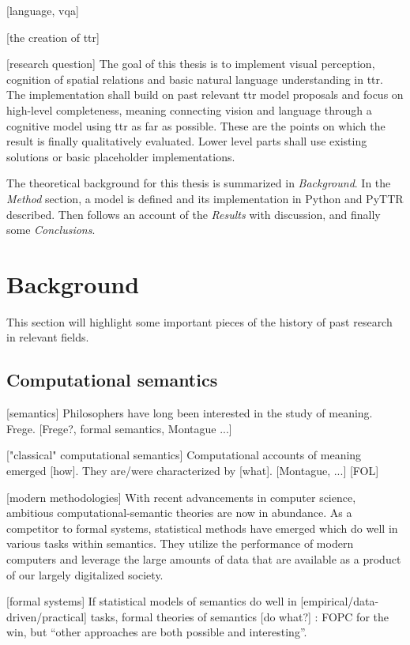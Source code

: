 \documentclass[11pt, a4paper]{article}
\begin{document}
[language, vqa]

[the creation of ttr]

[research question]
The goal of this thesis is to implement visual perception, cognition of spatial relations and basic natural language understanding in \gls{ttr}.
The implementation shall build on past relevant \gls{ttr} model proposals and focus on high-level completeness, meaning connecting vision and language through a cognitive model using \gls{ttr} as far as possible.
These are the points on which the result is finally qualitatively evaluated.
Lower level parts shall use existing solutions or basic placeholder implementations.

The theoretical background for this thesis is summarized in \textit{Background}.
In the \textit{Method} section, a model is defined and its implementation in Python and PyTTR described.
Then follows an account of the \textit{Results} with discussion, and finally some \textit{Conclusions}.



\glsresetall
\section{Background}
\label{sec:background}

This section will highlight some important pieces of the history of past research in relevant fields.

\subsection{Computational semantics}

[semantics]
Philosophers have long been interested in the study of meaning.
Frege.
[Frege?, formal semantics, Montague ...]

["classical" computational semantics]
Computational accounts of meaning emerged [how].
They are/were characterized by [what].
[Montague, ...]
[FOL]
\citep{BlackburnComputationalsemantics2003}


[modern methodologies]
With recent advancements in computer science, ambitious computational-semantic theories are now in abundance.
As a competitor to formal systems, statistical methods have emerged which do well in various tasks within semantics.
They utilize the performance of modern computers and leverage the large amounts of data that are available as a product of our largely digitalized society.


[formal systems]
If statistical models of semantics do well in [empirical/data-driven/practical] tasks, formal theories of semantics [do what?]
\cite{BlackburnComputationalsemantics2003}:
FOPC for the win, but ``other approaches are both possible and interesting''.
\end{document}
